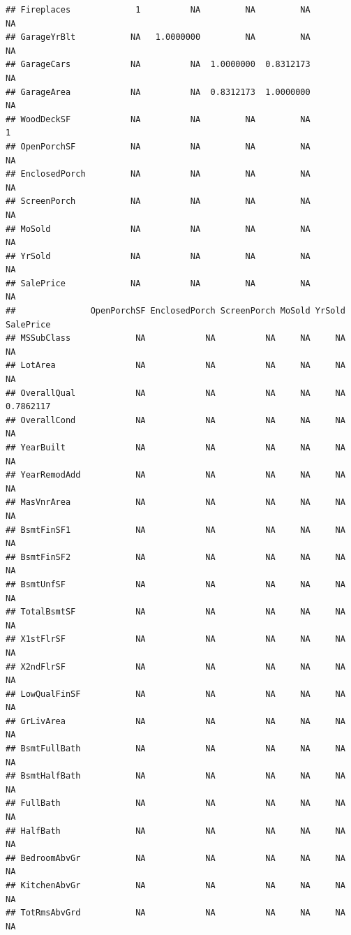 \documentclass[
]{article}
\begin{document}
\begin{verbatim}
## Fireplaces             1          NA         NA         NA         NA
## GarageYrBlt           NA   1.0000000         NA         NA         NA
## GarageCars            NA          NA  1.0000000  0.8312173         NA
## GarageArea            NA          NA  0.8312173  1.0000000         NA
## WoodDeckSF            NA          NA         NA         NA          1
## OpenPorchSF           NA          NA         NA         NA         NA
## EnclosedPorch         NA          NA         NA         NA         NA
## ScreenPorch           NA          NA         NA         NA         NA
## MoSold                NA          NA         NA         NA         NA
## YrSold                NA          NA         NA         NA         NA
## SalePrice             NA          NA         NA         NA         NA
##               OpenPorchSF EnclosedPorch ScreenPorch MoSold YrSold SalePrice
## MSSubClass             NA            NA          NA     NA     NA        NA
## LotArea                NA            NA          NA     NA     NA        NA
## OverallQual            NA            NA          NA     NA     NA 0.7862117
## OverallCond            NA            NA          NA     NA     NA        NA
## YearBuilt              NA            NA          NA     NA     NA        NA
## YearRemodAdd           NA            NA          NA     NA     NA        NA
## MasVnrArea             NA            NA          NA     NA     NA        NA
## BsmtFinSF1             NA            NA          NA     NA     NA        NA
## BsmtFinSF2             NA            NA          NA     NA     NA        NA
## BsmtUnfSF              NA            NA          NA     NA     NA        NA
## TotalBsmtSF            NA            NA          NA     NA     NA        NA
## X1stFlrSF              NA            NA          NA     NA     NA        NA
## X2ndFlrSF              NA            NA          NA     NA     NA        NA
## LowQualFinSF           NA            NA          NA     NA     NA        NA
## GrLivArea              NA            NA          NA     NA     NA        NA
## BsmtFullBath           NA            NA          NA     NA     NA        NA
## BsmtHalfBath           NA            NA          NA     NA     NA        NA
## FullBath               NA            NA          NA     NA     NA        NA
## HalfBath               NA            NA          NA     NA     NA        NA
## BedroomAbvGr           NA            NA          NA     NA     NA        NA
## KitchenAbvGr           NA            NA          NA     NA     NA        NA
## TotRmsAbvGrd           NA            NA          NA     NA     NA        NA

\end{verbatim}
\end{document}
